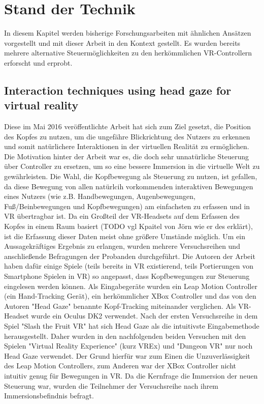 
\chapter{Stand der Technik}
In diesem Kapitel werden bisherige Forschungsarbeiten mit ähnlichen Ansätzen vorgestellt und mit dieser Arbeit in den Kontext gestellt. Es wurden bereits mehrere alternative Steuermöglichkeiten zu den herkömmlichen VR-Controllern erforscht und erprobt. 

\section{Interaction techniques using head gaze for virtual reality}
\label{paper1}
Diese im Mai 2016 veröffentlichte Arbeit hat sich zum Ziel gesetzt, die Position des Kopfes zu nutzen, um die ungefähre Blickrichtung des Nutzers zu erkennen und somit natürlichere Interaktionen in der virtuellen Realität zu ermöglichen. Die Motivation hinter der Arbeit war es, die doch sehr unnatürliche Steuerung über Controller zu ersetzen, um so eine bessere Immersion in die virtuelle Welt zu gewährleisten. Die Wahl, die Kopfbewegung als Steuerung zu nutzen, ist gefallen, da diese Bewegung von allen natürlcih vorkommenden interaktiven Bewegungen eines Nutzers (wie z.B. Handbewegungen, Augenbewegungen, Fuß/Beinbewegungen und Kopfbewegungen) am einfachsten zu erfassen und in VR übertragbar ist. Da ein Großteil der VR-Headsets auf dem Erfassen des Kopfes in einem Raum basiert (TODO vgl Kpaitel von Jörn wie er des erklärt), ist die Erfassung dieser Daten meist ohne größere Umstände möglich. Um ein Aussagekräftiges Ergebnis zu erlangen, wurden mehrere Versuchsreihen und anschließende Befragungen der Probanden durchgeführt. Die Autoren der Arbeit haben dafür einige Spiele (teils bereits in VR existierend, teils Portierungen von Smartphone Spielen in VR) so angepasst, dass Kopfbewegungen zur Steuerung eingelesen werden können. Als Eingabegeräte wurden ein Leap Motion Controller (ein Hand-Tracking Gerät), ein herkömmlicher XBox Controller und das von den Autoren "Head Gaze" benannte Kopf-Tracking miteinander verglichen. Als VR-Headset wurde ein Oculus DK2 verwendet. 
Nach der ersten Versuchsreihe in dem Spiel "Slash the Fruit VR" hat sich Head Gaze als die intuitivste Eingabemethode herausgestellt. Daher wurden in den nachfolgenden beiden Versuchen mit den Spielen "Virtual Reality Experience" (kurz VREx) und "Dungeon VR" nur noch Head Gaze verwendet. Der Grund hierfür war zum Einen die Unzuverlässigkeit des Leap Motion Controllers, zum Anderen war der XBox Controller nicht intuitiv genug für Bewegungen in VR. 
Da die Kernfrage die Immersion der neuen Steuerung war, wurden die Teilnehmer der Versuchsreihe nach ihrem Immersionsbefindnis befragt.

